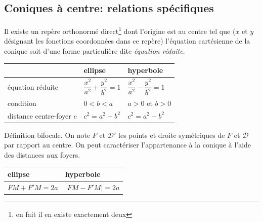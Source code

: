 \subsection{Coniques à centre: relations spécifiques}
Il existe un repère orthonormé direct\footnote{en fait il en existe exactement deux} dont l'origine est au centre tel que ($x$ et $y$ désignant les fonctions coordonnées dans ce repère) l'équation cartésienne de la conique soit d'une forme particulière dite \emph{équation réduite}.
\begin{center}
\renewcommand{\arraystretch}{3}
\begin{tabular}[c]{|l|l|l|}\hline
 & ellipse & hyperbole\\ \hline
équation réduite & $\dfrac{x^2}{a^2} + \dfrac{y^2}{b^2}=1 $ & $\dfrac{x^2}{a^2} - \dfrac{y^2}{b^2}=1 $\\ \hline
condition & $0<b<a$ & $a>0$ et $b>0$ \\ \hline
distance centre-foyer $c$ & $c^2 = a^2 - b^2$ & $c^2=a^2+b^2$ \\ \hline
\end{tabular}
\end{center}
Définition bifocale. On note $F$ et $\mathcal{D}'$ les points et droite symétriques de $F$ et $\mathcal{D}$ par rapport au centre. On peut caractériser l'appartenance à la conique à l'aide des distances aux foyers.
\begin{center}
\renewcommand{\arraystretch}{3}
\begin{tabular}[c]{|l|l|}\hline
  ellipse & hyperbole\\ \hline
$FM + F'M = 2a $ & $\vert FM - F'M\vert = 2a $\\ \hline
\end{tabular}
\end{center}

